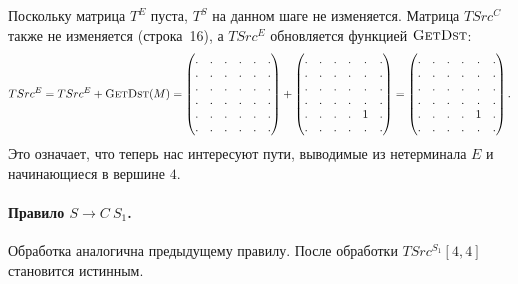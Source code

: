 Поскольку матрица $T^E$ пуста, $T^S$ на данном шаге не изменяется.
Матрица $TSrc^C$ также не изменяется (строка~16), а $TSrc^E$ обновляется функцией $\textsc{GetDst}$:
{
    \renewcommand{\arraystretch}{0.7}
    \setlength\arraycolsep{2pt}
\[
    TSrc^E = TSrc^E + \textsc{GetDst}(M) =
    \begin{pmatrix}
    . & . & . & . & . & . \\
    . & . & . & . & . & . \\
    . & . & . & . & . & . \\
    . & . & . & . & . & . \\
    . & . & . & . & . & . \\
    . & . & . & . & . & .
    \end{pmatrix} +
    \begin{pmatrix}
    . & . & . & . & . & . \\
    . & . & . & . & . & . \\
    . & . & . & . & . & . \\
    . & . & . & . & . & . \\
    . & . & . & . & 1 & . \\
    . & . & . & . & . & .
    \end{pmatrix} =
    \begin{pmatrix}
    . & . & . & . & . & . \\
    . & . & . & . & . & . \\
    . & . & . & . & . & . \\
    . & . & . & . & . & . \\
    . & . & . & . & 1 & . \\
    . & . & . & . & . & .
    \end{pmatrix}.
\]
}
Это означает, что теперь нас интересуют пути, выводимые из нетерминала $E$ и начинающиеся в вершине $4$.

\paragraph{Правило $S \to C\ S_1$.}
Обработка аналогична предыдущему правилу.
После обработки $TSrc^{S_1}[4,4]$ становится истинным.

